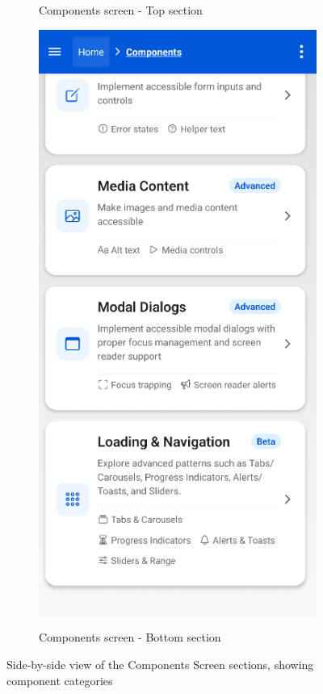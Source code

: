 \begin{figure}[ht]
\begin{subfigure}[b]{0.48\textwidth}
        \caption{Components screen - Top section}
        \label{fig:components-top}
    \end{subfigure}
    \hfill
    \begin{subfigure}[b]{0.48\textwidth}
        \centering
        \includegraphics[width=\linewidth, alt={Second part of the Components Screen}]{img/components2.png}
        \caption{Components screen - Bottom section}
        \label{fig:components-bottom}
    \end{subfigure}
    \caption{Side-by-side view of the Components Screen sections, showing component categories}
    \label{fig:components_screens_sidebyside}
\end{figure}

